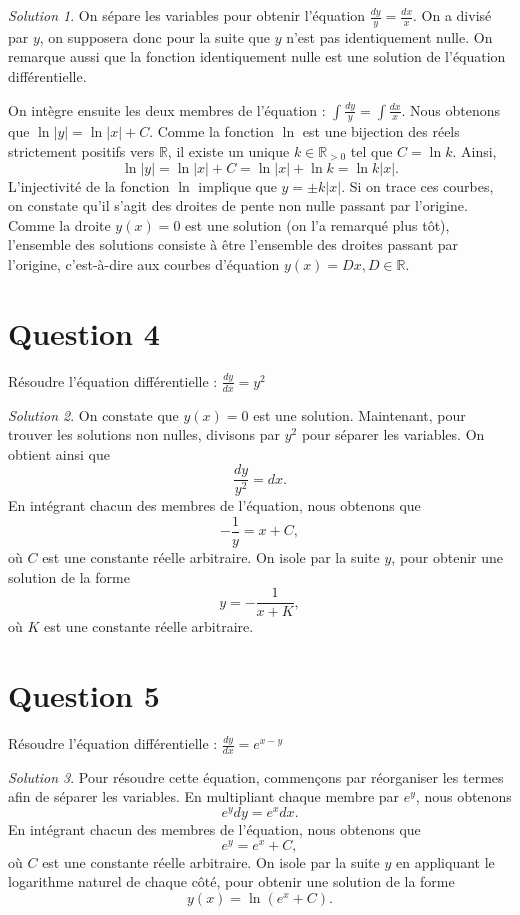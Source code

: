 \documentclass[
  12pt,
  letterpaper,
]{book}
\theoremstyle{remark}
\newtheorem*{solution}{Solution}
\begin{document}
\begin{solution}
On sépare les variables pour obtenir l'équation
\(\frac{dy}{y} = \frac{dx}{x}\). On a divisé par \(y\), on supposera
donc pour la suite que \(y\) n'est pas identiquement nulle. On remarque
aussi que la fonction identiquement nulle est une solution de l'équation
différentielle.

On intègre ensuite les deux membres de l'équation :
\(\int \frac{dy}{y} = \int \frac{dx}{x}\). Nous obtenons que
\(\ln|y| = \ln|x| + C\). Comme la fonction \(\ln\) est une bijection des
réels strictement positifs vers \(\mathbb{R}\), il existe un unique
\(k\in\mathbb{R}_{>0}\) tel que \(C=\ln k\). Ainsi,
\[\ln|y| = \ln|x| + C=\ln|x| + \ln k=\ln k|x|.\] L'injectivité de la
fonction \(\ln\) implique que \(y=\pm k|x|\). Si on trace ces courbes,
on constate qu'il s'agit des droites de pente non nulle passant par
l'origine. Comme la droite \(y(x)=0\) est une solution (on l'a remarqué
plus tôt), l'ensemble des solutions consiste à être l'ensemble des
droites passant par l'origine, c'est-à-dire aux courbes d'équation
\(y(x)=Dx, D\in\mathbb{R}\).
\end{solution}

\section{Question 4}\label{question-4}

Résoudre l'équation différentielle : \(\frac{dy}{dx} = y^2\)

\begin{solution}
On constate que \(y(x)=0\) est une solution. Maintenant, pour trouver
les solutions non nulles, divisons par \(y^2\) pour séparer les
variables. On obtient ainsi que \[\frac{dy}{y^2} = dx.\] En intégrant
chacun des membres de l'équation, nous obtenons que
\[-\frac{1}{y} = x + C,\] où \(C\) est une constante réelle arbitraire.
On isole par la suite \(y\), pour obtenir une solution de la forme
\[y = -\frac{1}{x + K},\] où \(K\) est une constante réelle arbitraire.
\end{solution}

\section{Question 5}\label{question-5}

Résoudre l'équation différentielle : \(\frac{dy}{dx} = e^{x-y}\)

\begin{solution}
Pour résoudre cette équation, commençons par réorganiser les termes afin
de séparer les variables. En multipliant chaque membre par \(e^y\), nous
obtenons \[e^y dy = e^x dx.\] En intégrant chacun des membres de
l'équation, nous obtenons que \[e^y = e^x + C,\] où \(C\) est une
constante réelle arbitraire. On isole par la suite \(y\) en appliquant
le logarithme naturel de chaque côté, pour obtenir une solution de la
forme \[y(x) = \ln(e^x + C).\]
\end{solution}
\end{document}
